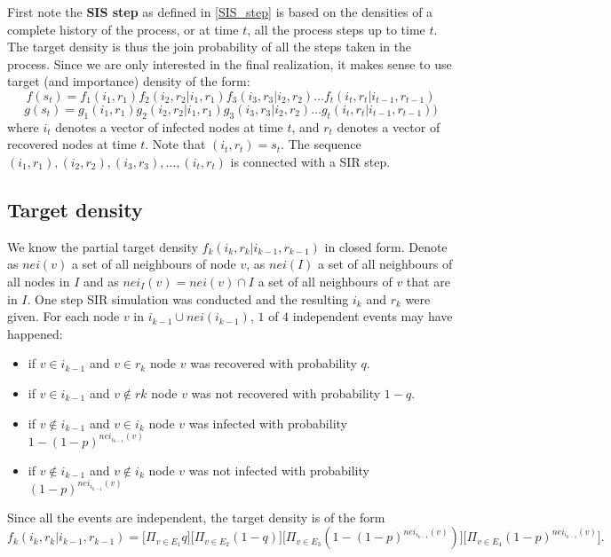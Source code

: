\documentclass[times, utf8, diplomski]{fer}
\begin{document}
First note the \textbf{SIS step} as defined in \ref{SIS_step} is based on the densities of a complete history of the process, or at time $t$, all the process steps up to time $t$. The target density is thus the join probability of all the steps taken in the process. Since we are only interested  in the final realization, it makes sense to use target (and importance) density of the form:
\begin{equation*}
f(s_t) = f_1(i_1, r_1) f_2(i_2, r_2 | i_1, r_1)  f_3(i_3, r_3 | i_2, r_2)  \ldots  f_t(i_t, r_t | i_{t - 1}, r_{t - 1})
\end{equation*}
\begin{equation*}
g(s_t) = g_1(i_1, r_1) g_2(i_2, r_2 | i_1, r_1) g_3(i_3, r_3 | i_2, r_2) \ldots  g_t(i_t, r_t | i_{t - 1}, r_{t - 1}))
\end{equation*}
where $i_t$ denotes a vector of infected nodes at time $t$, and $r_t$ denotes a vector of recovered nodes at time $t$. Note that $(i_t, r_t) = s_t$. The sequence $(i_1, r_1), (i_2, r_2), (i_3, r_3), \ldots, (i_t, r_t)$ is connected with a SIR step.

\subsection{Target density}
We know the partial target density $f_k(i_k, r_k | i_{k - 1}, r_{k - 1})$ in closed form. Denote as $nei(v)$ a set of all neighbours of node $v$, as $nei(I)$ a set of all neighbours of all nodes in $I$ and as $nei_I(v) = nei(v) \cap I$ a set of all neighbours of $v$ that are in $I$. One step SIR simulation was conducted and the resulting $i_k$ and $r_k$ were given. For each node $v$ in $i_{k - 1} \cup nei(i_{k - 1})$, $1$ of $4$ independent events may have happened:
\begin{itemize}
\item{if $v \in i_{k - 1}$ and $v \in r_{k}$ node $v$ was recovered with probability $q$.}
\item{if $v \in i_{k - 1}$ and $v \not\in r{k}$ node $v$ was not recovered with probability $1 - q$.}
\item{if $v \not\in i_{k - 1}$ and $v \in i_{k}$ node $v$ was infected with probability $1 - (1 - p) ^ {nei_{i_{k-1}}(v)}$}
\item{if $v \not\in i_{k - 1}$ and $v \not \in i_{k}$ node $v$ was not infected with probability $(1 - p)^{nei_{i_{k-1}}(v)}$}
\end{itemize}

Since all the events are independent, the target density is of the form
\begin{equation*}
f_k(i_k, r_k | i_{k - 1}, r_{k - 1}) = \big[\Pi_{v \in E_1} q\big]\big[ \Pi_{v \in E_2} (1 - q)\big]\big[\Pi_{v \in E_3} (1 - (1 - p) ^ {nei_{i_{k-1}}(v)})\big]\big[\Pi_{v \in E_4} (1 - p)^{nei_{i_{k-1}}(v)} \big].
\end{equation*}
\end{document}
